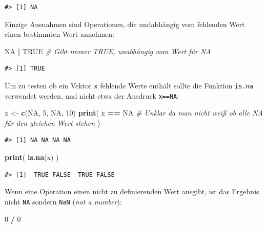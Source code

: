 \documentclass[]{book}
\newenvironment{Shaded}{\begin{snugshade}}{\end{snugshade}}
\newcommand{\KeywordTok}[1]{\textcolor[rgb]{0.13,0.29,0.53}{\textbf{#1}}}
\newcommand{\DecValTok}[1]{\textcolor[rgb]{0.00,0.00,0.81}{#1}}
\newcommand{\StringTok}[1]{\textcolor[rgb]{0.31,0.60,0.02}{#1}}
\newcommand{\CommentTok}[1]{\textcolor[rgb]{0.56,0.35,0.01}{\textit{#1}}}
\newcommand{\OtherTok}[1]{\textcolor[rgb]{0.56,0.35,0.01}{#1}}
\newcommand{\OperatorTok}[1]{\textcolor[rgb]{0.81,0.36,0.00}{\textbf{#1}}}
\newcommand{\NormalTok}[1]{#1}
\begin{document}
\begin{verbatim}
#> [1] NA
\end{verbatim}

Einzige Ausnahmen sind Operationen, die undabhängig vom fehlenden Wert
einen bestimmten Wert annehmen:

\begin{Shaded}
\begin{Highlighting}[]
\OtherTok{NA} \OperatorTok{|}\StringTok{ }\OtherTok{TRUE} \CommentTok{# Gibt immer TRUE, unabhängig vom Wert für NA}
\end{Highlighting}
\end{Shaded}

\begin{verbatim}
#> [1] TRUE
\end{verbatim}

Um zu testen ob ein Vektor \texttt{x} fehlende Werte enthält sollte die
Funktion \texttt{is.na} verwendet werden, und nicht etwa der Ausdruck
\texttt{x==NA}:

\begin{Shaded}
\begin{Highlighting}[]
\NormalTok{x <-}\StringTok{ }\KeywordTok{c}\NormalTok{(}\OtherTok{NA}\NormalTok{, }\DecValTok{5}\NormalTok{, }\OtherTok{NA}\NormalTok{, }\DecValTok{10}\NormalTok{)}
\KeywordTok{print}\NormalTok{(}
\NormalTok{  x }\OperatorTok{==}\StringTok{ }\OtherTok{NA} \CommentTok{# Unklar da man nicht weiß ob alle NA für den gleichen Wert stehen}
\NormalTok{  )}
\end{Highlighting}
\end{Shaded}

\begin{verbatim}
#> [1] NA NA NA NA
\end{verbatim}

\begin{Shaded}
\begin{Highlighting}[]
\KeywordTok{print}\NormalTok{(}
  \KeywordTok{is.na}\NormalTok{(x)}
\NormalTok{)}
\end{Highlighting}
\end{Shaded}

\begin{verbatim}
#> [1]  TRUE FALSE  TRUE FALSE
\end{verbatim}

Wenn eine Operation einen nicht zu definierenden Wert ausgibt, ist das
Ergebnis nicht \texttt{NA} sondern \texttt{NaN} (\emph{not a number}):

\begin{Shaded}
\begin{Highlighting}[]
\DecValTok{0} \OperatorTok{/}\StringTok{ }\DecValTok{0}
\end{Highlighting}
\end{Shaded}
\end{document}
